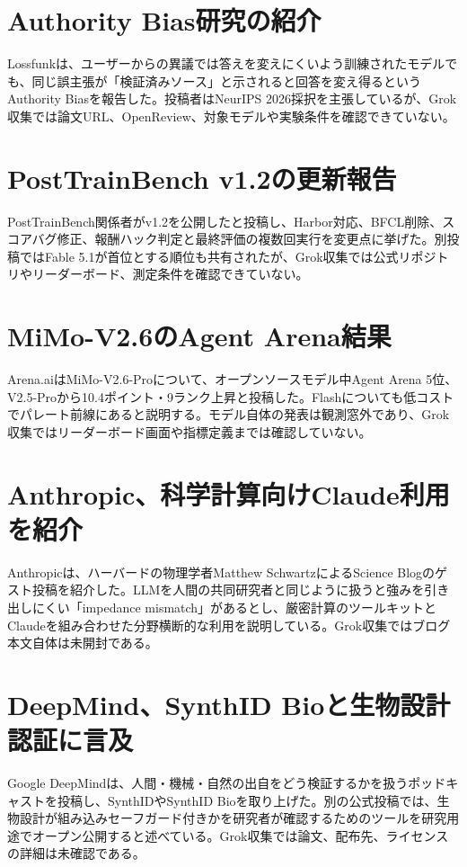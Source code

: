 \section{Authority Bias研究の紹介}
Lossfunkは、ユーザーからの異議では答えを変えにくいよう訓練されたモデルでも、同じ誤主張が「検証済みソース」と示されると回答を変え得るというAuthority Biasを報告した。投稿者はNeurIPS 2026採択を主張しているが、Grok収集では論文URL、OpenReview、対象モデルや実験条件を確認できていない。

\section{PostTrainBench v1.2の更新報告}
PostTrainBench関係者がv1.2を公開したと投稿し、Harbor対応、BFCL削除、スコアバグ修正、報酬ハック判定と最終評価の複数回実行を変更点に挙げた。別投稿ではFable 5.1が首位とする順位も共有されたが、Grok収集では公式リポジトリやリーダーボード、測定条件を確認できていない。

\section{MiMo-V2.6のAgent Arena結果}
Arena.aiはMiMo-V2.6-Proについて、オープンソースモデル中Agent Arena 5位、V2.5-Proから10.4ポイント・9ランク上昇と投稿した。Flashについても低コストでパレート前線にあると説明する。モデル自体の発表は観測窓外であり、Grok収集ではリーダーボード画面や指標定義までは確認していない。

\section{Anthropic、科学計算向けClaude利用を紹介}
Anthropicは、ハーバードの物理学者Matthew SchwartzによるScience Blogのゲスト投稿を紹介した。LLMを人間の共同研究者と同じように扱うと強みを引き出しにくい「impedance mismatch」があるとし、厳密計算のツールキットとClaudeを組み合わせた分野横断的な利用を説明している。Grok収集ではブログ本文自体は未開封である。

\section{DeepMind、SynthID Bioと生物設計認証に言及}
Google DeepMindは、人間・機械・自然の出自をどう検証するかを扱うポッドキャストを投稿し、SynthIDやSynthID Bioを取り上げた。別の公式投稿では、生物設計が組み込みセーフガード付きかを研究者が確認するためのツールを研究用途でオープン公開すると述べている。Grok収集では論文、配布先、ライセンスの詳細は未確認である。

